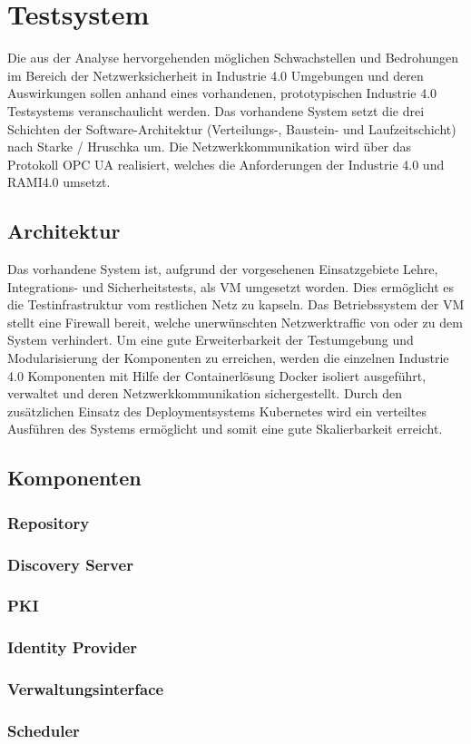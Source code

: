 \section{Testsystem}
\label{Grundlagen:Testsystem}
Die aus der Analyse hervorgehenden möglichen Schwachstellen und Bedrohungen im Bereich der Netzwerksicherheit in Industrie 4.0 Umgebungen und deren Auswirkungen sollen anhand eines vorhandenen, prototypischen Industrie 4.0 Testsystems \cite{Weber2018} veranschaulicht werden. Das vorhandene System setzt die drei Schichten der Software-Architektur (Verteilungs-, Baustein- und Laufzeitschicht) nach Starke / Hruschka um. Die Netzwerkkommunikation wird über das Protokoll \ac{OPC UA} realisiert, welches die Anforderungen der Industrie 4.0 und \ac{RAMI4.0} umsetzt.

\subsection{Architektur}
Das vorhandene System ist, aufgrund der vorgesehenen Einsatzgebiete Lehre, Integrations- und Sicherheitstests, als \ac{VM} umgesetzt worden. Dies ermöglicht es die Testinfrastruktur vom restlichen Netz zu kapseln. Das Betriebssystem der \ac{VM} stellt eine Firewall bereit, welche unerwünschten Netzwerktraffic von oder zu dem System verhindert. Um eine gute Erweiterbarkeit der Testumgebung und Modularisierung der Komponenten zu erreichen, werden die einzelnen Industrie 4.0 Komponenten mit Hilfe der Containerlösung Docker isoliert ausgeführt, verwaltet und deren Netzwerkkommunikation sichergestellt. Durch den zusätzlichen Einsatz des Deploymentsystems Kubernetes wird ein verteiltes Ausführen des Systems ermöglicht und somit eine gute Skalierbarkeit erreicht. 

\subsection{Komponenten}

\subsubsection{Repository}
\subsubsection{Discovery Server}
\subsubsection{\ac{PKI}}
\subsubsection{Identity Provider}
\subsubsection{Verwaltungsinterface}
\subsubsection{Scheduler}